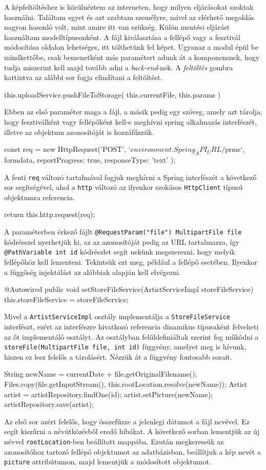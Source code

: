 A képfeltöltéshez is körülnéztem az interneten, hogy milyen eljárásokat szoktak használni. Találtam egyet és azt szabtam személyre, mivel az elérhető megoldás nagyon hasonló volt, mint amire itt van szükség. Külön mentési eljárást használtam modelltípusonként. A fájl kiválasztása a fellépő vagy a fesztivál módosítása oldalon lehetséges, itt tölthetünk fel képet. Ugyanaz a modul épül be mindkettőbe, csak bemenetként más paramétert adunk át a komponensnek, hogy tudja miszerint kell majd tovább adni a \textit{back-end}-nek. A \textit{feltöltés} gombra kattintva az alábbi sor fogja elindítani a feltöltést.
\begin{java}
this.uploadService.pushFileToStorage(
    this.currentFile, this.params
)
\end{java}
Ebben az első paraméter maga a fájl, a másik pedig egy szöveg, amely azt tárolja, hogy fesztiválként vagy fellépőként kell-e meghívni spring alkalmazás interfészét, illetve az objektum azonosítóját is hozzáfűzzük.
\begin{java}
const req = new HttpRequest('POST', 
`${environment.Spring_API_URL}/${prms}`, formdata, {
    reportProgress: true,
    responseType: 'text'
});
\end{java}
A fenti \texttt{req} változó tartalmával fogjuk meghívni a Spring interfészét a következő sor segítségével, ahol a \texttt{http} változó az ilyenkor szokásos \texttt{HttpClient} típusú objektumra referencia. 
\begin{java}
return this.http.request(req);
\end{java}
A paraméterben érkező fájlt \texttt{@RequestParam("file") MultipartFile file} kódrésszel nyerhetjük ki, az az azonosítóját pedig az URL tartalmazza, így \texttt{@PathVariable int id} kódrészlet segít nekünk megszerezni, hogy melyik fellépőhöz kell lementeni.
Tekintsük ezt meg, például a fellépő esetében. Ilyenkor a függőség injektálást az alábbiak alapján kell elvégezni.
\begin{java}
@Autowired
public void setStoreFileService(ArtistServiceImpl 
storeFileService) {
	this.storeFileService = storeFileService;
} 
\end{java}
Mivel a \texttt{ArtistServiceImpl} osztály implementálja a \texttt{StoreFileService} interfészt, ezért az interfészre hivatkozó referencia dinamikus típusaként felveheti az őt implementáló osztályt. Az osztályban felüldefiniáltak szerint fog működni a \texttt{storeFile(MultipartFile file, int id)} függvény, amelyet meg is hívunk, hiszen ez lesz felelős a tárolásért. Nézzük át a függvény fontosabb sorait.
\begin{java}
String newName =  currentDate + file.getOriginalFilename();
Files.copy(file.getInputStream(),
this.rootLocation.resolve(newName));
Artist artist = artistRepository.findOne(id);
artist.setPicture(newName);
artistRepository.save(artist);
\end{java}
Az első sor azért felelős, hogy összefűzze a jelenlegi dátumot a fájl nevével. Ez segít kiszűrni a névütközésből eredő hibákat. A következő sorban lementjük az új névvel \texttt{rootLocation}-ben beállított mappába. Ezután megkeressük az azonosítóhoz tartozó fellépő objektumot az adatbázisban, beállítjuk a kép nevét a \texttt{picture} attribútumon, majd lementjük a módosított objektumot.

